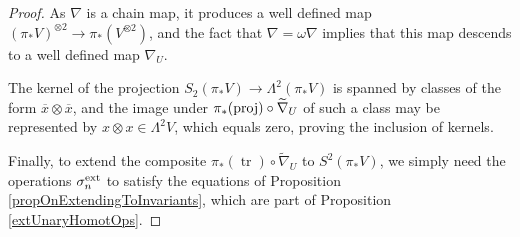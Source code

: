 \documentclass[11pt]{amsart} \renewcommand{\baselinestretch}{1.4}
\theoremstyle{plain}
\theoremstyle{definition}
\DeclareMathOperator{\trace}{tr}
\newcommand{\DASH}{\mathrm{-}}
\renewcommand{\to}{\longrightarrow}
\newcommand{\calV}{\mathcal{V}}
\newcommand{\restn}[1]{#1^{[2]}}
\newcommand{\vect}[2]{\calV^{#1}_{#2}}
\newcommand{\twist}{\omega}
\newcommand{\Nabla}{\nabla}
\renewcommand{\mapsto}{\longmapsto}
\begin{document}
\begin{Constructing homotopy operations}
\begin{proof}
As $\nabla$ is a chain  map, it produces a well defined map $(\pi_*V)^{\otimes2}\to \pi_*(V^{\otimes2})$, and the fact that $\nabla=\twist\nabla$ implies that this map descends to a well defined map $\nabla_U$.

The kernel of the projection $S_2(\pi_*V)\to \Lambda^2(\pi_*V)$ is spanned by classes of the form $\overline{x}\otimes \overline{x}$, and the image under $\pi_*(\textup{proj})\circ\widetilde{\nabla}_U$ of such a class may be represented by $x\otimes x\in \Lambda^2V$, which equals zero, proving the inclusion of kernels.

Finally, to extend the composite $\pi_*(\trace)\circ\widetilde{\nabla}_U$ to $S^2(\pi_*V)$, we simply need the operations $\sigma_n^\textup{ext}$ to satisfy the equations of Proposition \ref{propOnExtendingToInvariants}, which are part of Proposition \ref{extUnaryHomotOps}.
%
%
%
%
%
\end{proof}


\end{Constructing homotopy operations}
\end{document}
